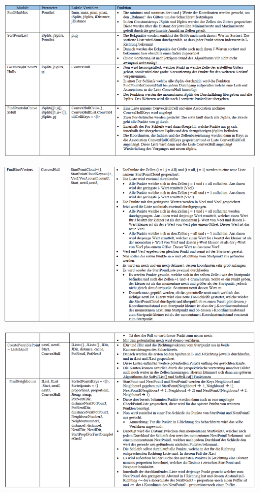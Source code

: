 \begin{minipage}{\linewidth}
	\centering
	\includegraphics[width=1\linewidth]{images/KD1.png}
\end{minipage}
\begin{minipage}{\linewidth}
	\centering
	\includegraphics[width=1\linewidth]{images/KD2.png}
\end{minipage}
\begin{minipage}{\linewidth}
	\centering
	\includegraphics[width=1\linewidth]{images/KD3.png}
\end{minipage}
